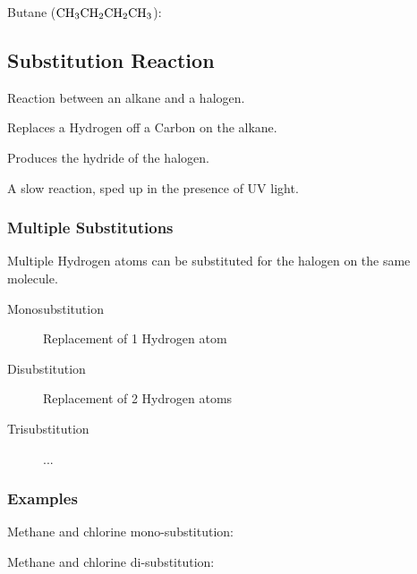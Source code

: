 \documentclass[a4paper,11pt]{article}
\begin{document}
Butane ($\ce{CH3CH2CH2CH3}$):

\begin{center}
\end{center}


\subsection{Substitution Reaction}

Reaction between an alkane and a halogen.

Replaces a Hydrogen off a Carbon on the alkane.

Produces the hydride of the halogen.

A slow reaction, sped up in the presence of UV light.


\subsubsection{Multiple Substitutions}

Multiple Hydrogen atoms can be substituted for the halogen on the same molecule.

\begin{description}
\item [Monosubstitution] Replacement of 1 Hydrogen atom
\item [Disubstitution] Replacement of 2 Hydrogen atoms
\item [Trisubstitution] ...
\end{description}


\subsubsection{Examples}

Methane and chlorine mono-substitution:

\begin{center}
\end{center}

Methane and chlorine di-substitution:

\begin{center}
\end{center}
\end{document}
